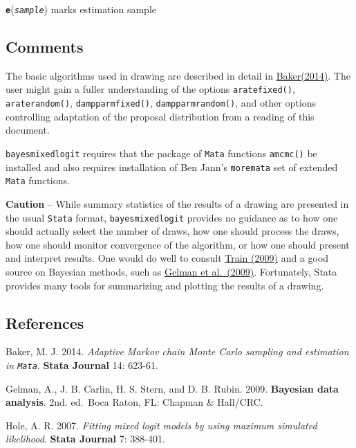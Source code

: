\documentclass[11pt]{article}
\begin{document}
\textbf{\texttt{e}}(\emph{\texttt{sample}}) marks estimation sample

    \hypertarget{comments}{%
\subsection{Comments}\label{comments}}

The basic algorithms used in drawing are described in detail in
\href{https://www.stata-journal.com/article.html?article=st0354}{Baker(2014)}.
The user might gain a fuller understanding of the options
\texttt{aratefixed()}, \texttt{araterandom()}, \texttt{dampparmfixed()},
\texttt{dampparmrandom()}, and other options controlling adaptation of
the proposal distribution from a reading of this document.

\texttt{bayesmixedlogit} requires that the package of \texttt{Mata}
functions \texttt{amcmc()} be installed and also requires installation
of Ben Jann's \texttt{moremata} set of extended \texttt{Mata} functions.

\textbf{Caution} -- While summary statistics of the results of a drawing
are presented in the usual \texttt{Stata} format,
\texttt{bayesmixedlogit} provides no guidance as to how one should
actually select the number of draws, how one should process the draws,
how one should monitor convergence of the algorithm, or how one should
present and interpret results. One would do well to consult
\href{https://eml.berkeley.edu/books/choice2.html}{Train (2009)} and a
good source on Bayesian methods, such as
\href{https://www.amazon.com/Bayesian-Analysis-Chapman-Statistical-Science/dp/158488388X}{Gelman
et al.~(2009)}. Fortunately, Stata provides many tools for summarizing
and plotting the results of a drawing.

    \hypertarget{references}{%
\subsection{References}\label{references}}

Baker, M. J. 2014. \emph{Adaptive Markov chain Monte Carlo sampling and
estimation in \texttt{Mata}}. \textbf{Stata Journal} 14: 623-61.

Gelman, A., J. B. Carlin, H. S. Stern, and D. B. Rubin. 2009.
\textbf{Bayesian data analysis}. 2nd. ed.~Boca Raton, FL: Chapman \&
Hall/CRC.

Hole, A. R. 2007. \emph{Fitting mixed logit models by using maximum
simulated likelihood}. \textbf{Stata Journal} 7: 388-401.
\end{document}
